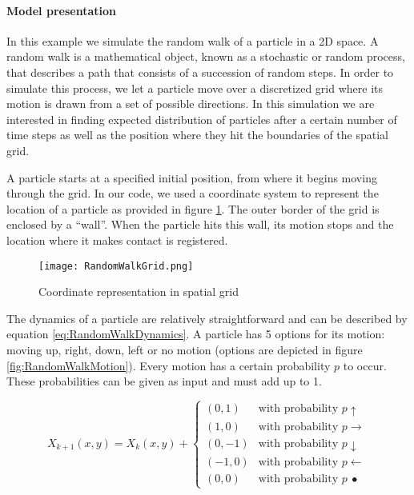 

\paragraph{Model presentation}
In this example we simulate the random walk of a particle in a 2D space. A random walk is a mathematical object, known as a stochastic or random process, that describes a path that consists of a succession of random steps. In order to simulate this process, we let a particle move over a discretized grid where its motion is drawn from a set of possible directions. In this simulation we are interested in finding expected distribution of particles after a certain number of time steps as well as the position where they hit the boundaries of the spatial grid.\newline

A particle starts at a specified initial position, from where it begins moving through the grid. In our code, we used a coordinate system to represent the location of a particle as provided in figure \ref{fig:RandomWalkGrid}. The outer border of the grid is enclosed by a ``wall''. When the particle hits this wall, its motion stops and the location where it makes contact is registered.

\begin{figure}[htb]
    \label{fig:RandomWalkGrid}
	\centering
	\texttt{[image: RandomWalkGrid.png]}       
	\caption{Coordinate representation in spatial grid}
\end{figure}

The dynamics of a particle are relatively straightforward and can be described by equation \ref{eq:RandomWalkDynamics}. A particle has 5 options for its motion: moving up, right, down, left or no motion (options are depicted in figure \ref{fig:RandomWalkMotion}). Every motion has a certain probability $p$ to occur. These probabilities can be given as input and must add up to 1.

\begin{equation}
\label{eq:RandomWalkDynamics}
X_{k+1}(x,y) = X_k(x,y) +  \begin{cases}
(0,1) &\text{with probability $p\uparrow$}\\
(1,0) &\text{with probability $p\rightarrow$}\\
(0,-1) &\text{with probability $p\downarrow$}\\
(-1,0) &\text{with probability $p\leftarrow$}\\
(0,0) &\text{with probability $p\ \bullet$}
\end{cases}
\end{equation}



